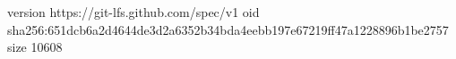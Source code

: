 version https://git-lfs.github.com/spec/v1
oid sha256:651dcb6a2d4644de3d2a6352b34bda4eebb197e67219ff47a1228896b1be2757
size 10608
